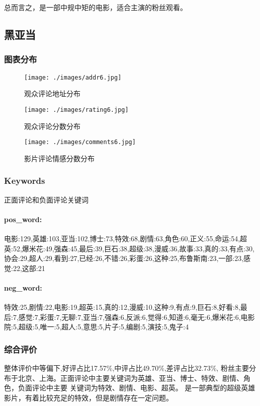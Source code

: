 \documentclass[12pt]{article}
\begin{document}
总而言之，是一部中规中矩的电影，适合主演的粉丝观看。

\subsection*{黑亚当}
\subsubsection*{图表分布}
\begin{figure}[H]
    \centering
    \begin{minipage}[t]{0.48\textwidth}
    \centering
    \texttt{[image: ./images/addr6.jpg]}
    \caption{观众评论地址分布}
    \end{minipage}
    \begin{minipage}[t]{0.48\textwidth}
    \centering
    \texttt{[image: ./images/rating6.jpg]}
    \caption{观众评论分数分布}
    \end{minipage}
\end{figure}
\begin{figure}[H]
    \centering
    \texttt{[image: ./images/comments6.jpg]}
    \caption{影片评论情感分数分布} 
\end{figure}
\subsubsection*{Keywords}
正面评论和负面评论关键词
\paragraph*{pos\_word:}
电影:129,英雄:103,亚当:102,博士:73,特效:68,剧情:63,角色:60,正义:55,命运:54,超英:52,爆米花:49,强森:45,最后:39,巨石:38,超级:38,漫威:36,故事:33,真的:33,有点:30,协会:29,超人:29,看到:27,已经:26,不错:26,彩蛋:26,这种:25,布鲁斯南:23,一部:23,感觉:22,这部:21
\paragraph*{neg\_word:}
特效:25,剧情:22,电影:19,超英:15,真的:12,漫威:10,这种:9,有点:9,巨石:8,好看:8,最后:7,感觉:7,彩蛋:7,无聊:7,亚当:7,强森:6,反派:6,觉得:6,知道:6,毫无:6,爆米花:6,电影院:5,超级:5,唯一:5,超人:5,意思:5,片子:5,编剧:5,演技:5,鬼子:4
\subsubsection*{综合评价}
整体评价中等偏下,好评占比17.57\%,中评占比49.70\%,差评占比32.73\%,
粉丝主要分布于北京、上海。正面评论中主要关键词为英雄、亚当、博士、特效、剧情、角色，负面评论中主要
关键词为特效、剧情、电影、超英。
是一部典型的超级英雄影片，有着比较充足的特效，但是剧情存在一定问题。
\end{document}
